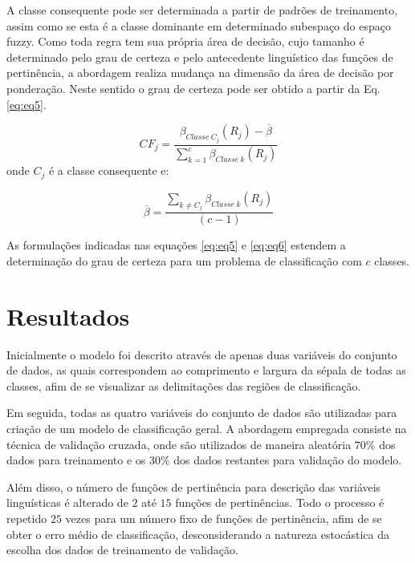 \documentclass[12pt,a4paper]{article}
\numberwithin{equation}{section}
\begin{document}
A classe consequente pode ser determinada a partir de padrões de treinamento, assim como se esta é a classe dominante em determinado subespaço do espaço fuzzy. Como toda regra tem sua própria área de decisão, cujo tamanho é determinado pelo grau de certeza e pelo antecedente linguístico das funções de pertinência, a abordagem realiza mudança na dimensão da área de decisão por ponderação. Neste sentido o grau de certeza pode ser obtido a partir da Eq. \eqref{eq:eq5}.

\begin{equation} \label{eq:eq5}
CF_{j}=\frac{\beta_{Classe~C_{j}}(R_{j})-\overline{\beta}}{\sum_{k=1}^{c}\beta_{Classe~k}(R_{j})}
\end{equation}
onde $C_{j}$ é a classe consequente e:

\begin{equation} \label{eq:eq6}
\overline{\beta}=\frac{\sum_{k\neq C_{j}}\beta_{Classe~k}(R_{j})}{(c-1)}
\end{equation}

As formulações indicadas nas equações \eqref{eq:eq5} e \eqref{eq:eq6} estendem a determinação do grau de certeza para um problema de classificação com $c$ classes.

\section{Resultados}

Inicialmente o modelo foi descrito através de apenas duas variáveis do conjunto de dados, as quais correspondem ao comprimento e largura da sépala de todas as classes, afim de se visualizar as delimitações das regiões de classificação.

Em seguida, todas as quatro variáveis do conjunto de dados são utilizadas para criação de um modelo de classificação geral. A abordagem empregada consiste na técnica de validação cruzada, onde são utilizados de maneira aleatória $70\%$ dos dados para treinamento e os $30\%$ dos dados restantes para validação do modelo.

Além disso, o número de funções de pertinência para descrição das variáveis linguísticas é alterado de $2$ até $15$ funções de pertinências. Todo o processo é repetido $25$ vezes para um número fixo de funções de pertinência, afim de se obter o erro médio de classificação, desconsiderando a natureza estocástica da escolha dos dados de treinamento de validação.
\end{document}
